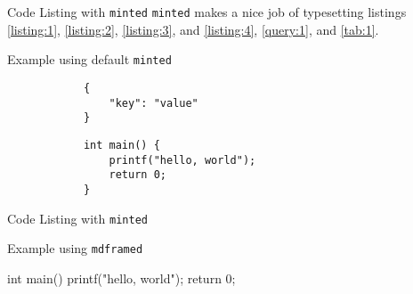 

\begin{frame}[fragile]{Code Listing with \texttt{minted}}
    \noindent\texttt{minted} makes a nice job of typesetting listings \ref{listing:1}, \ref{listing:2}, \ref{listing:3}, and \ref{listing:4}, \autoref{query:1}, and \autoref{tab:1}.

    \begin{listing}
        \caption{Example using default \texttt{minted}}
        \begin{verbatim}
            {
                "key": "value"
            }
        \end{verbatim}
        \begin{verbatim}
            int main() {
                printf("hello, world");
                return 0;
            }
        \end{verbatim}
        \label{listing:1}
    \end{listing}
\end{frame}

\begin{frame}[fragile]{Code Listing with \texttt{minted}}


    \begin{listing}
        \caption{Example using \texttt{mdframed}}
        \begin{Ccode}
            int main() {
                printf("hello, world");
                return 0;
            }
        \end{Ccode}
        \label{listing:2}
    \end{listing}
\end{frame}

